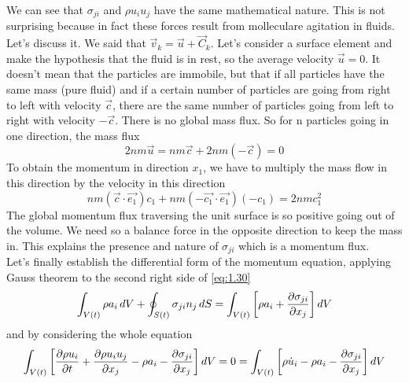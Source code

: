 		\begin{center}
		\end{center}
		We can see that $\sigma _{ji}$ and $\rho u_iu_j$ have the same mathematical nature. This is not surprising because in fact these forces result from molleculare agitation in fluids. Let's discuss it. We said that $\vec{v}_k = \vec{u} + \vec{C}_k$. Let's consider a surface element and make the hypothesis that the fluid is in rest, so the average velocity $\vec{u} = 0$. It doesn't mean that the particles are immobile, but that if all particles have the same mass (pure fluid) and if a certain number of particles are going from right to left with velocity $\vec{c}$, there are the same number of particles going from left to right with velocity $-\vec{c}$. There is no global mass flux. So for n particles going in one direction, the mass flux
		\begin{equation}
			2nm\vec{u} = nm\vec{c} + 2nm(-\vec{c}) = 0 
		\end{equation}
		To obtain the momentum in direction $x_1$, we have to multiply the mass flow in this direction by the velocity in this direction 
		\begin{equation}
			nm (\vec{c}\cdot \vec{e_1})c_1 + nm (-\vec{c_1}\cdot \vec{e_1})(-c_1) = 2nmc_1^2
		\end{equation}
		The global momentum flux traversing the unit surface is so positive going out of the volume. We need so a balance force in the opposite direction to keep the mass in. This explains the presence and nature of $\sigma _{ji}$ which is a momentum flux. \\
	Let's finally establish the differential form of the momentum equation, applying Gauss theorem to the second right side of \eqref{eq:1.30}
	\begin{equation}
		\int _{V(t)} \rho a_i\, dV + \oint _{S(t)} \sigma _{ji} n_j \, dS = \int _{V(t)} \left[ \rho a_i + \frac{\partial \sigma _{ji}}{\partial x_j} \right] dV
	\end{equation}
	and by considering the whole equation
	\begin{equation}
		\int _{V(t)} \left[ \frac{\partial \rho u_i}{\partial t} + \frac{\partial \rho u_i u_j}{\partial x_j} - \rho a_i - \frac{\partial \sigma _{ji}}{\partial x_j} \right] dV = 0 = \int _{V(t)} \left[ \rho \dot{u}_i - \rho a_i - \frac{\partial \sigma _{ji}}{\partial x_j} \right] dV
	\end{equation}
